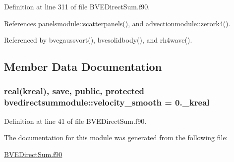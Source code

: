 Definition at line 311 of file B\+V\+E\+Direct\+Sum.\+f90.



References panelsmodule\+::scatterpanels(), and advectionmodule\+::zerork4().



Referenced by bvegaussvort(), bvesolidbody(), and rh4wave().



\subsection{Member Data Documentation}
\hypertarget{classbvedirectsummodule_a1a52fae15743a0c982e2d3ab09041bd3}{
\subsubsection[{velocity\+\_\+smooth}]{\setlength{\rightskip}{0pt plus 5cm}real(kreal), save, public, protected bvedirectsummodule\+::velocity\+\_\+smooth = 0.\+\_\+kreal}}\label{classbvedirectsummodule_a1a52fae15743a0c982e2d3ab09041bd3}


Definition at line 41 of file B\+V\+E\+Direct\+Sum.\+f90.



The documentation for this module was generated from the following file\+:\begin{DoxyCompactItemize}
\item 
\hyperlink{BVEDirectSum_8f90}{B\+V\+E\+Direct\+Sum.\+f90}\end{DoxyCompactItemize}
